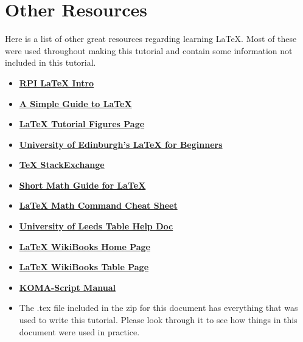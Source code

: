\section{Other Resources}
		Here is a list of other great resources regarding learning LaTeX. Most of these were used throughout making this tutorial and contain some information not included in this tutorial.
		\begin{itemize}
			\item \href{http://www.rpi.edu/dept/arc/docs/latex/latex-intro.pdf}{\textbf{RPI \LaTeX{} Intro}}
			\item \href{https://www.latex-tutorial.com/tutorials/}{\textbf{A Simple Guide to \LaTeX{}}}
			\item \href{https://www.latex-tutorial.com/tutorials/figures/}{\textbf{\LaTeX{} Tutorial Figures Page}}
			\item \href{http://www.docs.is.ed.ac.uk/skills/documents/3722/3722-2014.pdf}{\textbf{University of Edinburgh\rq{}s \LaTeX{} for Beginners}}
			\item \href{https://tex.stackexchange.com/}{\textbf{\TeX{} StackExchange}}
			\item \href{http://tug.ctan.org/info/short-math-guide/short-math-guide.pdf}{\textbf{Short Math Guide for \LaTeX{}}}
			\item \href{http://tug.ctan.org/info/undergradmath/undergradmath.pdf}{\textbf{\LaTeX{} Math Command Cheat Sheet}}
			\item \href{https://www1.maths.leeds.ac.uk/latex/TableHelp1.pdf}{\textbf{University of Leeds Table Help Doc}}
			\item \href{https://en.wikibooks.org/wiki/LaTeX}{\textbf{\LaTeX{} WikiBooks Home Page}}
			\item \href{https://en.wikibooks.org/wiki/LaTeX/Tables}{\textbf{\LaTeX{} WikiBooks Table Page}}
			\item \href{http://texdoc.net/texmf-dist/doc/latex/koma-script/scrguien.pdf}{\textbf{KOMA-Script Manual}}
			\item The .tex file included in the zip for this document has everything that was used to write this tutorial. Please look through it to see how things in this document were used in practice.
		\end{itemize}